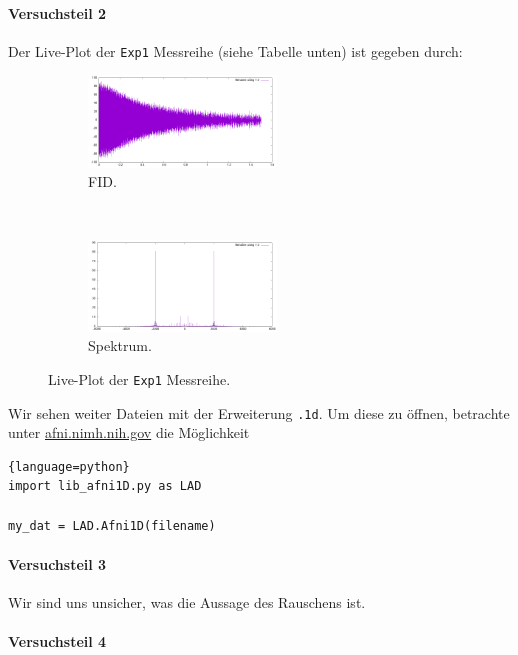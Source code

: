 \documentclass{subfiles}
\begin{document}
        \paragraph*{Versuchsteil 2}
            Der Live-Plot der \texttt{Exp1} Messreihe (siehe Tabelle unten) ist gegeben durch:
            \begin{figure}[H]
                \centering
                \begin{subfigure}[b]{0.4\textwidth}
                    \centering
                    \includegraphics[width=5cm]{Live-Dokumente/Bilder/Exp1_FID.png}
                    \caption{FID.}
                \end{subfigure}
                \
                \begin{subfigure}[b]{0.4\textwidth}
                    \centering
                    \includegraphics[width=5cm]{Live-Dokumente/Bilder/Exp1_Spectrum.png}
                    \caption{Spektrum.}
                \end{subfigure}
                \caption{Live-Plot der \texttt{Exp1} Messreihe.}
                \label{fig:LivePlotExp1}
            \end{figure}
            Wir sehen weiter Dateien mit der Erweiterung \texttt{.1d}. Um diese zu öffnen, betrachte unter \href{https://afni.nimh.nih.gov/afni/community/board/read.php?1,160269,160270}{afni.nimh.nih.gov} die Möglichkeit 
\begin{lstlisting}{language=python}
import lib_afni1D.py as LAD

my_dat = LAD.Afni1D(filename)
\end{lstlisting}


        \paragraph*{Versuchsteil 3}
            Wir sind uns unsicher, was die Aussage des Rauschens ist. 

        \paragraph*{Versuchsteil 4}
\end{document}
